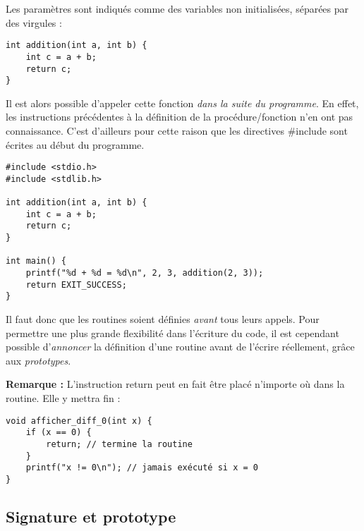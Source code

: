 \documentclass[../../../main.tex]{subfiles}
\begin{document}
Les paramètres sont indiqués comme des variables non initialisées, séparées par des virgules :
\begin{verbatim}
int addition(int a, int b) {
	int c = a + b;
	return c;
}
\end{verbatim}
Il est alors possible d'appeler cette fonction \textit{dans la suite du programme}. En effet, les instructions précédentes à la définition de la procédure/fonction n'en ont pas connaissance. C'est d'ailleurs pour cette raison que les directives \textsf{\#include} sont écrites au début du programme.
\begin{verbatim}
#include <stdio.h>
#include <stdlib.h>

int addition(int a, int b) {
	int c = a + b;
	return c;
}

int main() {
	printf("%d + %d = %d\n", 2, 3, addition(2, 3));
	return EXIT_SUCCESS;
}
\end{verbatim}
Il faut donc que les routines soient définies \textit{avant} tous leurs appels. Pour permettre une plus grande flexibilité dans l'écriture du code, il est cependant possible d'\textit{annoncer} la définition d'une routine avant de l'écrire réellement, grâce aux \textit{prototypes}.
 
\textbf{Remarque :} L'instruction \textsf{return} peut en fait être placé n'importe où dans la routine. Elle y mettra fin :
\begin{verbatim}
void afficher_diff_0(int x) {
	if (x == 0) {
		return; // termine la routine
	}
	printf("x != 0\n"); // jamais exécuté si x = 0
}
\end{verbatim}
\subsection{Signature et prototype}
\end{document}
